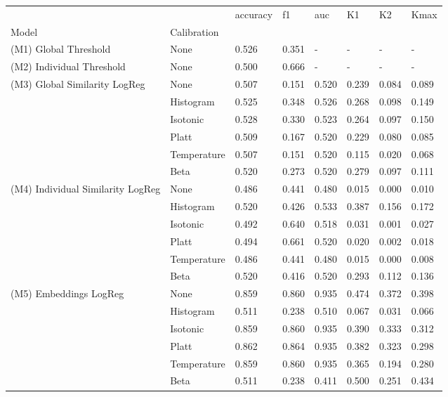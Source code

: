 \begin{tabular}{llllllll}
\toprule
 &  & accuracy & f1 & auc & K1 & K2 & Kmax \\
Model & Calibration &  &  &  &  &  &  \\
\midrule
(M1) Global Threshold & None & 0.526 & 0.351 & - & - & - & - \\
\cline{1-8}
(M2) Individual Threshold & None & 0.500 & 0.666 & - & - & - & - \\
\cline{1-8}
\multirow[t]{6}{*}{(M3) Global Similarity LogReg} & None & 0.507 & 0.151 & 0.520 & 0.239 & 0.084 & 0.089 \\
 & Histogram & 0.525 & 0.348 & 0.526 & 0.268 & 0.098 & 0.149 \\
 & Isotonic & 0.528 & 0.330 & 0.523 & 0.264 & 0.097 & 0.150 \\
 & Platt & 0.509 & 0.167 & 0.520 & 0.229 & 0.080 & 0.085 \\
 & Temperature & 0.507 & 0.151 & 0.520 & 0.115 & 0.020 & 0.068 \\
 & Beta & 0.520 & 0.273 & 0.520 & 0.279 & 0.097 & 0.111 \\
\cline{1-8}
\multirow[t]{6}{*}{(M4) Individual Similarity LogReg} & None & 0.486 & 0.441 & 0.480 & 0.015 & 0.000 & 0.010 \\
 & Histogram & 0.520 & 0.426 & 0.533 & 0.387 & 0.156 & 0.172 \\
 & Isotonic & 0.492 & 0.640 & 0.518 & 0.031 & 0.001 & 0.027 \\
 & Platt & 0.494 & 0.661 & 0.520 & 0.020 & 0.002 & 0.018 \\
 & Temperature & 0.486 & 0.441 & 0.480 & 0.015 & 0.000 & 0.008 \\
 & Beta & 0.520 & 0.416 & 0.520 & 0.293 & 0.112 & 0.136 \\
\cline{1-8}
\multirow[t]{6}{*}{(M5) Embeddings LogReg} & None & 0.859 & 0.860 & 0.935 & 0.474 & 0.372 & 0.398 \\
 & Histogram & 0.511 & 0.238 & 0.510 & 0.067 & 0.031 & 0.066 \\
 & Isotonic & 0.859 & 0.860 & 0.935 & 0.390 & 0.333 & 0.312 \\
 & Platt & 0.862 & 0.864 & 0.935 & 0.382 & 0.323 & 0.298 \\
 & Temperature & 0.859 & 0.860 & 0.935 & 0.365 & 0.194 & 0.280 \\
 & Beta & 0.511 & 0.238 & 0.411 & 0.500 & 0.251 & 0.434 \\
\cline{1-8}
\bottomrule
\end{tabular}
